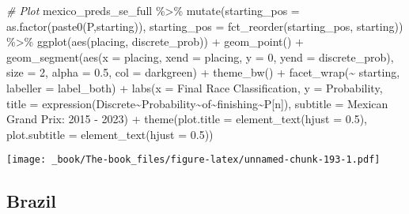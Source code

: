 \documentclass[
]{book}
\newenvironment{Shaded}{\begin{snugshade}}{\end{snugshade}}
\newcommand{\AttributeTok}[1]{\textcolor[rgb]{0.77,0.63,0.00}{#1}}
\newcommand{\CommentTok}[1]{\textcolor[rgb]{0.56,0.35,0.01}{\textit{#1}}}
\newcommand{\DecValTok}[1]{\textcolor[rgb]{0.00,0.00,0.81}{#1}}
\newcommand{\FloatTok}[1]{\textcolor[rgb]{0.00,0.00,0.81}{#1}}
\newcommand{\FunctionTok}[1]{\textcolor[rgb]{0.00,0.00,0.00}{#1}}
\newcommand{\NormalTok}[1]{#1}
\newcommand{\SpecialCharTok}[1]{\textcolor[rgb]{0.00,0.00,0.00}{#1}}
\newcommand{\StringTok}[1]{\textcolor[rgb]{0.31,0.60,0.02}{#1}}
\begin{document}
\begin{Shaded}
\begin{Highlighting}[]
\CommentTok{\# Plot}
\NormalTok{mexico\_preds\_se\_full }\SpecialCharTok{\%\textgreater{}\%}
  \FunctionTok{mutate}\NormalTok{(}\AttributeTok{starting\_pos =} \FunctionTok{as.factor}\NormalTok{(}\FunctionTok{paste0}\NormalTok{(}\StringTok{\textquotesingle{}P\textquotesingle{}}\NormalTok{,starting)),}
         \AttributeTok{starting\_pos =} \FunctionTok{fct\_reorder}\NormalTok{(starting\_pos, starting)) }\SpecialCharTok{\%\textgreater{}\%}
  \FunctionTok{ggplot}\NormalTok{(}\FunctionTok{aes}\NormalTok{(placing, discrete\_prob)) }\SpecialCharTok{+}
  \FunctionTok{geom\_point}\NormalTok{() }\SpecialCharTok{+}
  \FunctionTok{geom\_segment}\NormalTok{(}\FunctionTok{aes}\NormalTok{(}\AttributeTok{x =}\NormalTok{ placing, }\AttributeTok{xend =}\NormalTok{ placing, }\AttributeTok{y =} \DecValTok{0}\NormalTok{, }\AttributeTok{yend =}\NormalTok{ discrete\_prob),}
               \AttributeTok{size =} \DecValTok{2}\NormalTok{, }\AttributeTok{alpha =} \FloatTok{0.5}\NormalTok{, }\AttributeTok{col =} \StringTok{\textquotesingle{}darkgreen\textquotesingle{}}\NormalTok{) }\SpecialCharTok{+}
  \FunctionTok{theme\_bw}\NormalTok{() }\SpecialCharTok{+}
  \FunctionTok{facet\_wrap}\NormalTok{(}\SpecialCharTok{\textasciitilde{}}\NormalTok{ starting, }\AttributeTok{labeller =}\NormalTok{ label\_both) }\SpecialCharTok{+}
  \FunctionTok{labs}\NormalTok{(}\AttributeTok{x =} \StringTok{\textquotesingle{}Final Race Classification\textquotesingle{}}\NormalTok{,}
       \AttributeTok{y =} \StringTok{\textquotesingle{}Probability\textquotesingle{}}\NormalTok{,}
       \AttributeTok{title =} \FunctionTok{expression}\NormalTok{(Discrete}\SpecialCharTok{\textasciitilde{}}\NormalTok{Probability}\SpecialCharTok{\textasciitilde{}}\NormalTok{of}\SpecialCharTok{\textasciitilde{}}\NormalTok{finishing}\SpecialCharTok{\textasciitilde{}}\NormalTok{P[n]),}
       \AttributeTok{subtitle =} \StringTok{\textquotesingle{}Mexican Grand Prix: 2015 {-} 2023\textquotesingle{}}\NormalTok{) }\SpecialCharTok{+}
  \FunctionTok{theme}\NormalTok{(}\AttributeTok{plot.title =} \FunctionTok{element\_text}\NormalTok{(}\AttributeTok{hjust =} \FloatTok{0.5}\NormalTok{),}
        \AttributeTok{plot.subtitle =} \FunctionTok{element\_text}\NormalTok{(}\AttributeTok{hjust =} \FloatTok{0.5}\NormalTok{)) }
\end{Highlighting}
\end{Shaded}

\texttt{[image: \_book/The-book\_files/figure-latex/unnamed-chunk-193-1.pdf]}

\hypertarget{brazil-1}{%
\subsection{Brazil}\label{brazil-1}}
\end{document}
